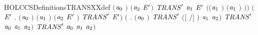 \begin{SaveVerbatim}{HOLCCSDefinitionsTRANSXXdef}
                      \ensuremath{(}\ensuremath{\HOLBoundVar{a}\sb{\mathrm{0}}} \HOLSymConst{\ensuremath{=}}   \ensuremath{)} \HOLSymConst{\HOLTokenConj{}} \ensuremath{(}\ensuremath{\HOLBoundVar{a}\sb{\mathrm{2}}} \HOLSymConst{\ensuremath{=}}   \ensuremath{\HOLBoundVar{E}\sp{\prime}}\ensuremath{)} \HOLSymConst{\HOLTokenConj{}}
                      \ensuremath{\HOLBoundVar{TRANS}\sp{\prime}}  \ensuremath{\HOLBoundVar{a}\sb{\mathrm{1}}} \ensuremath{\HOLBoundVar{E}\sp{\prime}} \HOLSymConst{\HOLTokenConj{}}
                      \ensuremath{(}\ensuremath{(}\ensuremath{\HOLBoundVar{a}\sb{\mathrm{1}}} \HOLSymConst{\ensuremath{=}} \HOLConst{\ensuremath{\tau}}\ensuremath{)} \HOLSymConst{\HOLTokenDisj{}}
                       \ensuremath{(}\ensuremath{\HOLBoundVar{a}\sb{\mathrm{1}}} \HOLSymConst{\ensuremath{=}}  \ensuremath{)} \HOLSymConst{\HOLTokenConj{}}  \HOLConst{\HOLTokenNotIn{}}  \HOLSymConst{\HOLTokenConj{}}   \HOLConst{\HOLTokenNotIn{}} \ensuremath{)}\ensuremath{)} \HOLSymConst{\HOLTokenDisj{}}
                 \ensuremath{(}\HOLSymConst{\HOLTokenExists{}}  \ensuremath{\HOLBoundVar{E}\sp{\prime}} .
                      \ensuremath{(}\ensuremath{\HOLBoundVar{a}\sb{\mathrm{0}}} \HOLSymConst{\ensuremath{=}}   \ensuremath{)} \HOLSymConst{\HOLTokenConj{}} \ensuremath{(}\ensuremath{\HOLBoundVar{a}\sb{\mathrm{1}}} \HOLSymConst{\ensuremath{=}}   \ensuremath{)} \HOLSymConst{\HOLTokenConj{}}
                      \ensuremath{(}\ensuremath{\HOLBoundVar{a}\sb{\mathrm{2}}} \HOLSymConst{\ensuremath{=}}  \ensuremath{\HOLBoundVar{E}\sp{\prime}} \ensuremath{)} \HOLSymConst{\HOLTokenConj{}} \ensuremath{\HOLBoundVar{TRANS}\sp{\prime}}   \ensuremath{\HOLBoundVar{E}\sp{\prime}}\ensuremath{)} \HOLSymConst{\HOLTokenDisj{}}
                 \ensuremath{(}\HOLSymConst{\HOLTokenExists{}} .
                      \ensuremath{(}\ensuremath{\HOLBoundVar{a}\sb{\mathrm{0}}} \HOLSymConst{\ensuremath{=}}   \ensuremath{)} \HOLSymConst{\HOLTokenConj{}}
                      \ensuremath{\HOLBoundVar{TRANS}\sp{\prime}} \ensuremath{(}\ensuremath{[}  \ensuremath{/}\ensuremath{]} \ensuremath{)} \ensuremath{\HOLBoundVar{a}\sb{\mathrm{1}}} \ensuremath{\HOLBoundVar{a}\sb{\mathrm{2}}}\ensuremath{)} \HOLSymConst{\HOLTokenImp{}}
                 \ensuremath{\HOLBoundVar{TRANS}\sp{\prime}} \ensuremath{\HOLBoundVar{a}\sb{\mathrm{0}}} \ensuremath{\HOLBoundVar{a}\sb{\mathrm{1}}} \ensuremath{\HOLBoundVar{a}\sb{\mathrm{2}}}\ensuremath{)} \HOLSymConst{\HOLTokenImp{}}
            \ensuremath{\HOLBoundVar{TRANS}\sp{\prime}} \ensuremath{\HOLBoundVar{a}\sb{\mathrm{0}}} \ensuremath{\HOLBoundVar{a}\sb{\mathrm{1}}} \ensuremath{\HOLBoundVar{a}\sb{\mathrm{2}}}\ensuremath{)}
\end{SaveVerbatim}
